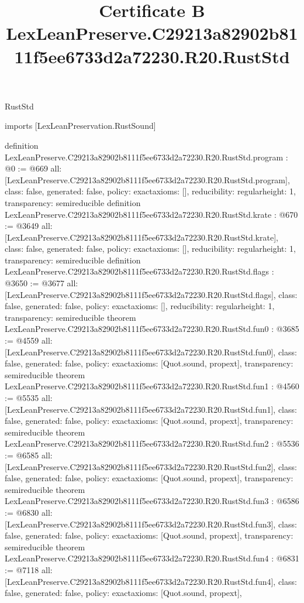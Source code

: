 \begin{lexlean}{RustStd}
\title{Certificate B LexLeanPreserve.C29213a82902b8111f5ee6733d2a72230.R20.RustStd}
\begin{coremodule}
imports [LexLeanPreservation.RustSound]

definition LexLeanPreserve.C29213a82902b8111f5ee6733d2a72230.R20.RustStd.program : @0 := @669 {
  all: [LexLeanPreserve.C29213a82902b8111f5ee6733d2a72230.R20.RustStd.program],
  class: false,
  generated: false,
  policy: exact{axioms: []},
  reducibility: regular{height: 1},
  transparency: semireducible
}
definition LexLeanPreserve.C29213a82902b8111f5ee6733d2a72230.R20.RustStd.krate : @670 := @3649 {
  all: [LexLeanPreserve.C29213a82902b8111f5ee6733d2a72230.R20.RustStd.krate],
  class: false,
  generated: false,
  policy: exact{axioms: []},
  reducibility: regular{height: 1},
  transparency: semireducible
}
definition LexLeanPreserve.C29213a82902b8111f5ee6733d2a72230.R20.RustStd.flags : @3650 := @3677 {
  all: [LexLeanPreserve.C29213a82902b8111f5ee6733d2a72230.R20.RustStd.flags],
  class: false,
  generated: false,
  policy: exact{axioms: []},
  reducibility: regular{height: 1},
  transparency: semireducible
}
theorem LexLeanPreserve.C29213a82902b8111f5ee6733d2a72230.R20.RustStd.fun0 : @3685 := @4559 {
  all: [LexLeanPreserve.C29213a82902b8111f5ee6733d2a72230.R20.RustStd.fun0],
  class: false,
  generated: false,
  policy: exact{axioms: [Quot.sound, propext]},
  transparency: semireducible
}
theorem LexLeanPreserve.C29213a82902b8111f5ee6733d2a72230.R20.RustStd.fun1 : @4560 := @5535 {
  all: [LexLeanPreserve.C29213a82902b8111f5ee6733d2a72230.R20.RustStd.fun1],
  class: false,
  generated: false,
  policy: exact{axioms: [Quot.sound, propext]},
  transparency: semireducible
}
theorem LexLeanPreserve.C29213a82902b8111f5ee6733d2a72230.R20.RustStd.fun2 : @5536 := @6585 {
  all: [LexLeanPreserve.C29213a82902b8111f5ee6733d2a72230.R20.RustStd.fun2],
  class: false,
  generated: false,
  policy: exact{axioms: [Quot.sound, propext]},
  transparency: semireducible
}
theorem LexLeanPreserve.C29213a82902b8111f5ee6733d2a72230.R20.RustStd.fun3 : @6586 := @6830 {
  all: [LexLeanPreserve.C29213a82902b8111f5ee6733d2a72230.R20.RustStd.fun3],
  class: false,
  generated: false,
  policy: exact{axioms: [Quot.sound, propext]},
  transparency: semireducible
}
theorem LexLeanPreserve.C29213a82902b8111f5ee6733d2a72230.R20.RustStd.fun4 : @6831 := @7118 {
  all: [LexLeanPreserve.C29213a82902b8111f5ee6733d2a72230.R20.RustStd.fun4],
  class: false,
  generated: false,
  policy: exact{axioms: [Quot.sound, propext]},
}
\end{coremodule}
\end{lexlean}
